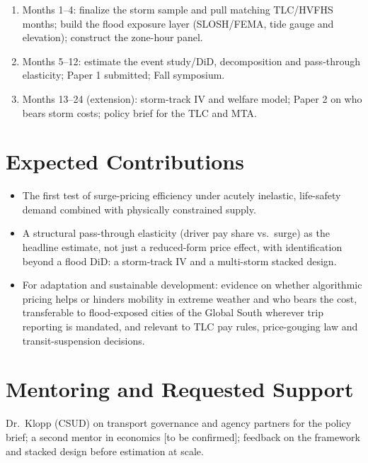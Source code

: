 \documentclass[11pt]{article}
\begin{document}
\begin{enumerate}
\item Months 1--4: finalize the storm sample and pull matching TLC/HVFHS months; build the flood exposure layer (SLOSH/FEMA, tide gauge and elevation); construct the zone-hour panel.
\item Months 5--12: estimate the event study/DiD, decomposition and pass-through elasticity; Paper 1 submitted; Fall symposium.
\item Months 13--24 (extension): storm-track IV and welfare model; Paper 2 on who bears storm costs; policy brief for the TLC and MTA.
\end{enumerate}

\section{Expected Contributions}

\begin{itemize}
\item The first test of surge-pricing efficiency under acutely inelastic, life-safety demand combined with physically constrained supply.
\item A structural pass-through elasticity (driver pay share vs.\ surge) as the headline estimate, not just a reduced-form price effect, with identification beyond a flood DiD: a storm-track IV and a multi-storm stacked design.
\item For adaptation and sustainable development: evidence on whether algorithmic pricing helps or hinders mobility in extreme weather and who bears the cost, transferable to flood-exposed cities of the Global South wherever trip reporting is mandated, and relevant to TLC pay rules, price-gouging law and transit-suspension decisions.
\end{itemize}

\section{Mentoring and Requested Support}

Dr.\ Klopp (CSUD) on transport governance and agency partners for the policy brief; a second mentor in economics [to be confirmed]; feedback on the framework and stacked design before estimation at scale.
\end{document}
